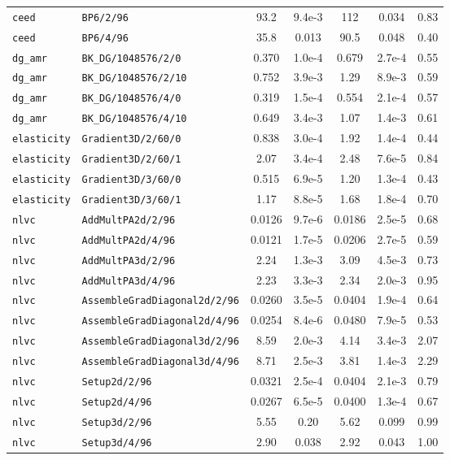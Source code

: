 \begin{tabular}{ll S[table-format=3.4e-1] S[table-format=1.2e-1] S[table-format=3.4e-1] S[table-format=1.2e-1] S[table-format=2.2]}
\texttt{ceed} & \texttt{BP6/2/96} & 93.2 & 9.4e-3 & 112 & 0.034 & 0.83 \\
\texttt{ceed} & \texttt{BP6/4/96} & 35.8 & 0.013 & 90.5 & 0.048 & 0.40 \\
\texttt{dg\_amr} & \texttt{BK\_DG/1048576/2/0} & 0.370 & 1.0e-4 & 0.679 & 2.7e-4 & 0.55 \\
\texttt{dg\_amr} & \texttt{BK\_DG/1048576/2/10} & 0.752 & 3.9e-3 & 1.29 & 8.9e-3 & 0.59 \\
\texttt{dg\_amr} & \texttt{BK\_DG/1048576/4/0} & 0.319 & 1.5e-4 & 0.554 & 2.1e-4 & 0.57 \\
\texttt{dg\_amr} & \texttt{BK\_DG/1048576/4/10} & 0.649 & 3.4e-3 & 1.07 & 1.4e-3 & 0.61 \\
\texttt{elasticity} & \texttt{Gradient3D/2/60/0} & 0.838 & 3.0e-4 & 1.92 & 1.4e-4 & 0.44 \\
\texttt{elasticity} & \texttt{Gradient3D/2/60/1} & 2.07 & 3.4e-4 & 2.48 & 7.6e-5 & 0.84 \\
\texttt{elasticity} & \texttt{Gradient3D/3/60/0} & 0.515 & 6.9e-5 & 1.20 & 1.3e-4 & 0.43 \\
\texttt{elasticity} & \texttt{Gradient3D/3/60/1} & 1.17 & 8.8e-5 & 1.68 & 1.8e-4 & 0.70 \\
\texttt{nlvc} & \texttt{AddMultPA2d/2/96} & 0.0126 & 9.7e-6 & 0.0186 & 2.5e-5 & 0.68 \\
\texttt{nlvc} & \texttt{AddMultPA2d/4/96} & 0.0121 & 1.7e-5 & 0.0206 & 2.7e-5 & 0.59 \\
\texttt{nlvc} & \texttt{AddMultPA3d/2/96} & 2.24 & 1.3e-3 & 3.09 & 4.5e-3 & 0.73 \\
\texttt{nlvc} & \texttt{AddMultPA3d/4/96} & 2.23 & 3.3e-3 & 2.34 & 2.0e-3 & 0.95 \\
\texttt{nlvc} & \texttt{AssembleGradDiagonal2d/2/96} & 0.0260 & 3.5e-5 & 0.0404 & 1.9e-4 & 0.64 \\
\texttt{nlvc} & \texttt{AssembleGradDiagonal2d/4/96} & 0.0254 & 8.4e-6 & 0.0480 & 7.9e-5 & 0.53 \\
\texttt{nlvc} & \texttt{AssembleGradDiagonal3d/2/96} & 8.59 & 2.0e-3 & 4.14 & 3.4e-3 & 2.07 \\
\texttt{nlvc} & \texttt{AssembleGradDiagonal3d/4/96} & 8.71 & 2.5e-3 & 3.81 & 1.4e-3 & 2.29 \\
\texttt{nlvc} & \texttt{Setup2d/2/96} & 0.0321 & 2.5e-4 & 0.0404 & 2.1e-3 & 0.79 \\
\texttt{nlvc} & \texttt{Setup2d/4/96} & 0.0267 & 6.5e-5 & 0.0400 & 1.3e-4 & 0.67 \\
\texttt{nlvc} & \texttt{Setup3d/2/96} & 5.55 & 0.20 & 5.62 & 0.099 & 0.99 \\
\texttt{nlvc} & \texttt{Setup3d/4/96} & 2.90 & 0.038 & 2.92 & 0.043 & 1.00 \\
\bottomrule
\end{tabular}
